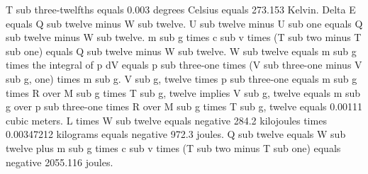 T sub three-twelfths equals 0.003 degrees Celsius equals 273.153 Kelvin.
Delta E equals Q sub twelve minus W sub twelve.
U sub twelve minus U sub one equals Q sub twelve minus W sub twelve.
m sub g times c sub v times (T sub two minus T sub one) equals Q sub twelve minus W sub twelve.
W sub twelve equals m sub g times the integral of p dV equals p sub three-one times (V sub three-one minus V sub g, one) times m sub g.
V sub g, twelve times p sub three-one equals m sub g times R over M sub g times T sub g, twelve implies V sub g, twelve equals m sub g over p sub three-one times R over M sub g times T sub g, twelve equals 0.00111 cubic meters.
L times W sub twelve equals negative 284.2 kilojoules times 0.00347212 kilograms equals negative 972.3 joules.
Q sub twelve equals W sub twelve plus m sub g times c sub v times (T sub two minus T sub one) equals negative 2055.116 joules.